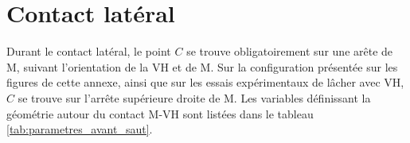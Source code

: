 \section{Contact latéral}
\label{subsubsec:4.3.2.a_Avant saut}
\begin{table}[!htbp]
   \centering
   \captionsetup{justification=centering}
   \caption{Définition des paramètres géométriques d'entrée et de sortie dans la configuration du contact latéral M-VH}
   \label{tab:parametres_avant_saut}
\end{table}
Durant le contact latéral, le point $C$ se trouve obligatoirement sur une arête de M, suivant l'orientation de la VH et de M. Sur la configuration présentée sur les figures de cette annexe, ainsi que sur les essais expérimentaux de lâcher avec VH, $C$ se trouve sur l'arrête supérieure droite de M. Les variables définissant la géométrie autour du contact M-VH sont listées dans le tableau \ref{tab:parametres_avant_saut}.

